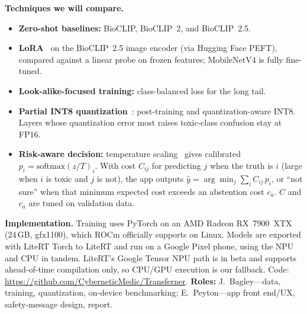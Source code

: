 \documentclass[conference,10pt]{IEEEtran}
\begin{document}
\textbf{Techniques we will compare.}
\begin{itemize}
\item \textbf{Zero-shot baselines:} BioCLIP, BioCLIP~2, and BioCLIP~2.5.
\item \textbf{LoRA}~\cite{hu2022lora} on the BioCLIP~2.5 image encoder (via
Hugging Face PEFT), compared against a linear probe on frozen features;
MobileNetV4 is fully fine-tuned.
\item \textbf{Look-alike-focused training:} class-balanced loss
for the long tail.
\item \textbf{Partial INT8 quantization}~\cite{nagel2021whitepaper}:
post-training and quantization-aware INT8. Layers whose quantization error most raises
toxic-class confusion stay at FP16.
\item \textbf{Risk-aware decision:} temperature scaling~\cite{guo2017calibration}
gives calibrated $p_i=\mathrm{softmax}(z/T)_i$. With cost $C_{ij}$ for predicting $j$
when the truth is $i$ (large when $i$ is toxic and $j$ is not), the app outputs
$\hat{y}=\arg\min_j \sum_i C_{ij}\,p_i$, or ``not sure'' when that minimum expected cost
exceeds an abstention cost $c_a$. $C$ and $c_a$ are tuned on validation data.
\end{itemize}

\textbf{Implementation.} Training uses PyTorch on an AMD
Radeon RX~7900~XTX (24\,GB, gfx1100), which ROCm officially supports on
Linux. Models are exported with LiteRT
Torch to LiteRT and run on a Google Pixel phone, using the NPU and CPU in
tandem. LiteRT's Google Tensor NPU path is in beta and
supports ahead-of-time compilation only, so CPU/GPU execution is our
fallback.
Code: \url{https://github.com/CyberneticMedic/Transferner}.
\textbf{Roles:} J.~Bagley---data, training, quantization, on-device benchmarking;
E.~Peyton---app front end/UX, safety-message design, report.

\end{document}
